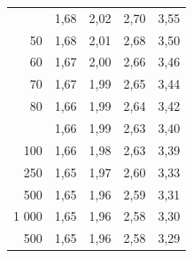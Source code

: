 \documentclass[
  11pt,
  french,
]{book}
\begin{document}
\begin{table}
\begin{tabular}[t]{rrrrr}
\addlinespace
40 & 1,68 & 2,02 & 2,70 & 3,55\\
50 & 1,68 & 2,01 & 2,68 & 3,50\\
60 & 1,67 & 2,00 & 2,66 & 3,46\\
70 & 1,67 & 1,99 & 2,65 & 3,44\\
80 & 1,66 & 1,99 & 2,64 & 3,42\\
\addlinespace
90 & 1,66 & 1,99 & 2,63 & 3,40\\
100 & 1,66 & 1,98 & 2,63 & 3,39\\
250 & 1,65 & 1,97 & 2,60 & 3,33\\
500 & 1,65 & 1,96 & 2,59 & 3,31\\
1 000 & 1,65 & 1,96 & 2,58 & 3,30\\
\addlinespace
2 500 & 1,65 & 1,96 & 2,58 & 3,29\\
\bottomrule
\end{tabular}
\end{table}

  

\printindex
\end{document}
